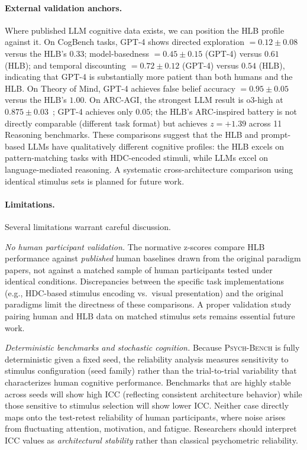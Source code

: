 \documentclass[11pt,letterpaper]{article}
\newcommand{\psychbench}{\textsc{Psych-Bench}}
\newcommand{\hlb}{\textsc{HLB}}
\begin{document}
\paragraph{External validation anchors.} Where published LLM cognitive data exists, we can position the \hlb{} profile against it. On CogBench tasks, GPT-4 shows directed exploration $= 0.12 \pm 0.08$~\citep{codaforno2024cogbench} versus the \hlb{}'s $0.33$; model-basedness $= 0.45 \pm 0.15$ (GPT-4) versus $0.61$ (\hlb{}); and temporal discounting $= 0.72 \pm 0.12$ (GPT-4) versus $0.54$ (\hlb{}), indicating that GPT-4 is substantially more patient than both humans and the \hlb{}. On Theory of Mind, GPT-4 achieves false belief accuracy $= 0.95 \pm 0.05$~\citep{kosinski2023theory} versus the \hlb{}'s $1.00$. On ARC-AGI, the strongest LLM result is o3-high at $0.875 \pm 0.03$~\citep{chollet2019measure}; GPT-4 achieves only $0.05$; the \hlb{}'s ARC-inspired battery is not directly comparable (different task format) but achieves $z = +1.39$ across 11 Reasoning benchmarks. These comparisons suggest that the \hlb{} and prompt-based LLMs have qualitatively different cognitive profiles: the \hlb{} excels on pattern-matching tasks with HDC-encoded stimuli, while LLMs excel on language-mediated reasoning. A systematic cross-architecture comparison using identical stimulus sets is planned for future work.

\paragraph{Limitations.} Several limitations warrant careful discussion.

\emph{No human participant validation.} The normative z-scores compare \hlb{} performance against \emph{published} human baselines drawn from the original paradigm papers, not against a matched sample of human participants tested under identical conditions. Discrepancies between the specific task implementations (e.g., HDC-based stimulus encoding vs.\ visual presentation) and the original paradigms limit the directness of these comparisons. A proper validation study pairing human and \hlb{} data on matched stimulus sets remains essential future work.

\emph{Deterministic benchmarks and stochastic cognition.} Because \psychbench{} is fully deterministic given a fixed seed, the reliability analysis measures sensitivity to stimulus configuration (seed family) rather than the trial-to-trial variability that characterizes human cognitive performance. Benchmarks that are highly stable across seeds will show high ICC (reflecting consistent architecture behavior) while those sensitive to stimulus selection will show lower ICC. Neither case directly maps onto the test-retest reliability of human participants, where noise arises from fluctuating attention, motivation, and fatigue. Researchers should interpret ICC values as \emph{architectural stability} rather than classical psychometric reliability.
\end{document}

